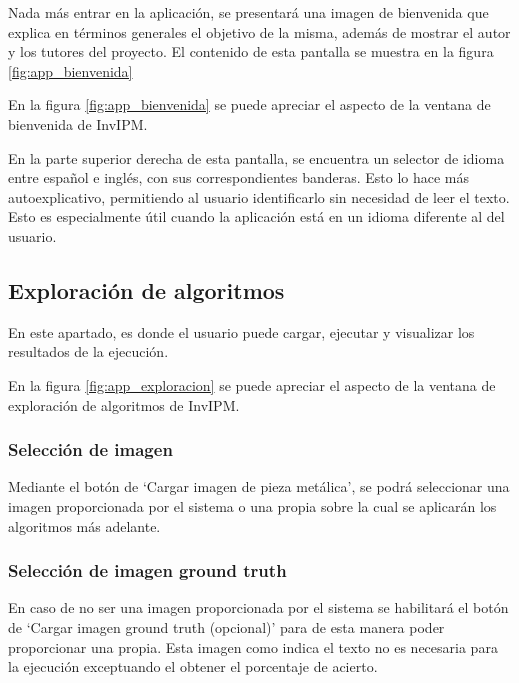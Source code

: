Nada más entrar en la aplicación, se presentará una imagen de bienvenida que explica en términos generales el objetivo de la misma, además de mostrar el autor y los tutores del proyecto. El contenido de esta pantalla se muestra en la figura \ref{fig:app_bienvenida}


En la figura \ref{fig:app_bienvenida} se puede apreciar el aspecto de la ventana de bienvenida de InvIPM.

En la parte superior derecha de esta pantalla, se encuentra un selector de idioma entre español e inglés, con sus correspondientes banderas. Esto lo hace más autoexplicativo, permitiendo al usuario identificarlo sin necesidad de leer el texto. Esto es especialmente útil cuando la aplicación está en un idioma diferente al del usuario.

\subsection{Exploración de algoritmos}\label{exploración-de-algoritmos}

En este apartado, es donde el usuario puede cargar, ejecutar y visualizar los resultados de la ejecución.


En la figura \ref{fig:app_exploracion} se puede apreciar el aspecto de la ventana de exploración de algoritmos de InvIPM.

\subsubsection{Selección de imagen}\label{selección-de-imagen}

Mediante el botón de `Cargar imagen de pieza metálica', se podrá seleccionar una imagen proporcionada por el sistema o una propia sobre la cual se aplicarán los algoritmos más adelante.

\subsubsection{Selección de imagen ground truth}\label{selección-de-imagen-ground-truth}

En caso de no ser una imagen proporcionada por el sistema se habilitará el botón de `Cargar imagen ground truth (opcional)' para de esta manera poder proporcionar una propia. Esta imagen como indica el texto no es necesaria para la ejecución exceptuando el obtener el porcentaje de acierto.

